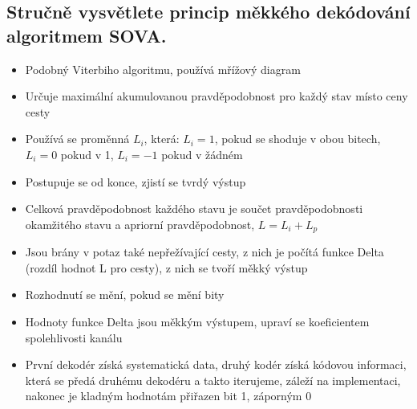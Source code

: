 \subsection{Stručně vysvětlete princip měkkého dekódování algoritmem SOVA.}
\begin{itemize}
    \item Podobný Viterbiho algoritmu, používá mřížový diagram
    \item Určuje maximální akumulovanou pravděpodobnost pro každý stav místo ceny cesty
    \item Používá se proměnná $L_i$, která: $L_i=1$, pokud se shoduje v obou bitech,
    $L_i=0$ pokud v 1, $L_i=-1$ pokud v žádném
    \item Postupuje se od konce, zjistí se tvrdý výstup
    \item Celková pravděpodobnost každého stavu je součet pravděpodobnosti okamžitého stavu a apriorní pravděpodobnost,
    $L=L_i+L_p$
    \item Jsou brány v potaz také nepřežívající cesty, z nich je počítá funkce Delta (rozdíl hodnot L pro cesty), 
    z nich se tvoří měkký výstup
    \item Rozhodnutí se mění, pokud se mění bity
    \item Hodnoty funkce Delta jsou měkkým výstupem, upraví se koeficientem spolehlivosti kanálu
    \item První dekodér získá systematická data, druhý kodér získá kódovou informaci, která se předá druhému 
    dekodéru a takto iterujeme, záleží na implementaci, nakonec je kladným hodnotám přiřazen bit 1, záporným 0
\end{itemize}
